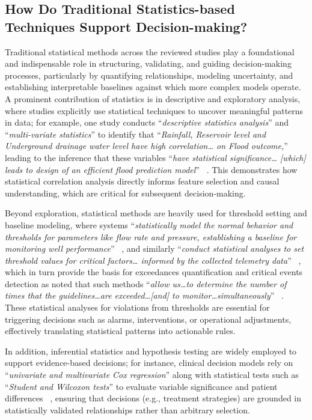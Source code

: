 \documentclass{sfuthesis}
\begin{document}
\subsection{How Do Traditional Statistics-based Techniques Support Decision-making?}
Traditional statistical methods across the reviewed studies play a foundational and indispensable role in structuring, validating, and guiding decision-making processes, particularly by quantifying relationships, modeling uncertainty, and establishing interpretable baselines against which more complex models operate. A prominent contribution of statistics is in descriptive and exploratory analysis, where studies explicitly use statistical techniques to uncover meaningful patterns in data; for example, one study conducts “\textit{descriptive statistics analysis}” and “\textit{multi-variate statistics}” to identify that “\textit{Rainfall, Reservoir level and Underground drainage water level have high correlation… on Flood outcome,}” leading to the inference that these variables “\textit{have statistical significance… [which] leads to design of an efficient flood prediction model}” ~\cite{sreepathy2023design}. This demonstrates how statistical correlation analysis directly informs feature selection and causal understanding, which are critical for subsequent decision-making.\par
Beyond exploration, statistical methods are heavily used for threshold setting and baseline modeling, where systems “\textit{statistically model the normal behavior and thresholds for parameters like flow rate and pressure, establishing a baseline for monitoring well performance}” ~\cite{ataei2024intelligent}, and similarly “\textit{conduct statistical analyses to set threshold values for critical factors… informed by the collected telemetry data}” ~\cite{ataei2024intelligent}, which in turn provide the basis for exceedances quantification and critical events detection as noted that such methods “\textit{allow us…to determine the number of times that the guidelines…are exceeded…[and] to monitor…simultaneously}” ~\cite{cavieres_methodology_2020}. These statistical analyses for violations from thresholds are essential for triggering decisions such as alarms, interventions, or operational adjustments, effectively translating statistical patterns into actionable rules.\par
In addition, inferential statistics and hypothesis testing are widely employed to support evidence-based decisions; for instance, clinical decision models rely on “\textit{univariate and multivariate Cox regression}” along with statistical tests such as “\textit{Student and Wilcoxon tests}” to evaluate variable significance and patient differences ~\cite{wang2023data}, ensuring that decisions (e.g., treatment strategies) are grounded in statistically validated relationships rather than arbitrary selection.\par 
\end{document}
